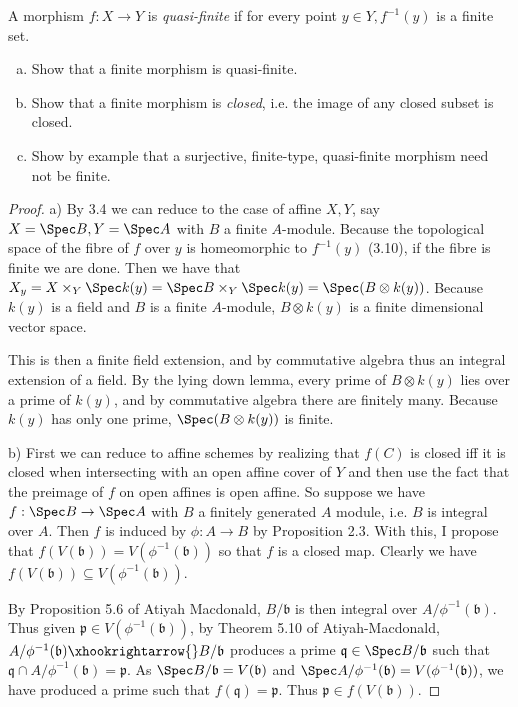 \begin{exercise}%
	A morphism $f: X\to Y $ is \textit{quasi-finite} if for every point $y \in Y, f^{-1}(y) $ is a finite set.
	\begin{enumerate}[(a)]
		\item Show that a finite morphism is quasi-finite.
		\item Show that a finite morphism is \textit{closed}, i.e. the image of any closed subset is closed.
		\item Show by example that a surjective, finite-type, quasi-finite morphism need not be finite.
	\end{enumerate}
\end{exercise}
\begin{proof}
	a) By 3.4 we can reduce to the case of affine $X,Y $, say $X = \Spec B, Y = \Spec A$ with $B $ a finite $A $-module.
	Because the topological space of the fibre of $f $ over $y $ is homeomorphic to $f^{-1}(y) $ (3.10), if the fibre is finite we are done.
	Then we have that $X_y = X \times _Y \Spec k(y) = \Spec B \times _Y \Spec k(y) = \Spec(B \otimes k(y)) $.
	Because $k(y) $ is a field and $B $ is a finite $A $-module, $B \otimes k(y) $ is a finite dimensional vector space.

	This is then a finite field extension, and by commutative algebra thus an integral extension of a field.
	By the lying down lemma, every prime of $B \otimes k(y) $ lies over a prime of $k(y) $, and by commutative algebra there are finitely many.
	Because $k(y) $ has only one prime, $\Spec(B \otimes k(y)) $ is finite.

	b) First we can reduce to affine schemes by realizing that $f(C) $ is closed iff it is closed when intersecting with an open affine cover of $Y $ and then use the fact that the preimage of $f $ on open affines is open affine.
	So suppose we have $f: \Spec B \to \Spec A $ with $B $ a finitely generated $A $ module, i.e. $B $ is integral over $A $.
	Then $f $ is induced by $\phi :A\to B $ by Proposition 2.3.
	With this, I propose that $f(V(\mathfrak{b})) = V(\phi ^{-1}(\mathfrak{b}))$ so that $f $ is a closed map.
	Clearly we have $f(V(\mathfrak{b})) \subseteq V(\phi ^{-1}(\mathfrak{b})) $.

	By Proposition 5.6 of Atiyah Macdonald, $B / \mathfrak{b} $ is then integral over $A / \phi ^{-1}(\mathfrak{b}) $.
	Thus given $\mathfrak{p}\in V(\phi ^{-1}(\mathfrak{b})) $, by Theorem 5.10 of Atiyah-Macdonald, $A / \phi ^{-1}(\mathfrak{b}) \xhookrightarrow{} B / \mathfrak{b} $ produces a prime $\mathfrak{q} \in \Spec B / \mathfrak{b} $ such that $\mathfrak{q}\cap A / \phi ^{-1}(\mathfrak{b}) = \mathfrak{p} $.
	As $\Spec B / \mathfrak{b} = V(\mathfrak{b}) $ and $\Spec A / \phi ^{-1}(\mathfrak{b}) = V(\phi ^{-1}(\mathfrak{b}))$, we have produced a prime such that $f(\mathfrak{q}) = \mathfrak{p} $.
	Thus $\mathfrak{p} \in f(V(\mathfrak{b})) $.


\end{proof}
